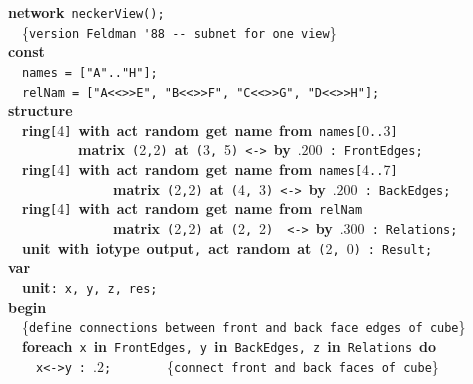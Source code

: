 {\bf network}~\verb&neckerView&\verb&(&\verb&)&\verb&;&\\
~~{\footnotesize \{\verb{version Feldman '88 -- subnet for one view{\}}\\
{\bf const}~\\
~~\verb&names&~\verb&=&~\verb&[&\verb&"A"&\verb&..&\verb&"H"&\verb&]&\verb&;&\\
~~\verb&relNam&~\verb&=&~\verb&[&\verb&"A<<>>E"&\verb&,&~\verb&"B<<>>F"&\verb&,&~\verb&"C<<>>G"&\verb&,&~\verb&"D<<>>H"&\verb&]&\verb&;&\\
{\bf structure}\\
~~{\bf ring}\verb&[&4\verb&]&~{\bf with}~{\bf act}~{\bf random}~{\bf get}~{\bf name}~{\bf from}~\verb&names&\verb&[&0\verb&..&3\verb&]&~\\
~~~~~~~~~~{\bf matrix}~\verb&(&2\verb&,&2\verb&)&~{\bf at}~\verb&(&3\verb&,&~5\verb&)&~\verb&<->&~{\bf by}~$.200$~\verb&:&~\verb&FrontEdges&\verb&;&\\
~~{\bf ring}\verb&[&4\verb&]&~{\bf with}~{\bf act}~{\bf random}~{\bf get}~{\bf name}~{\bf from}~\verb&names&\verb&[&4\verb&..&7\verb&]&\\
~~~~~~~~~~~~~~~{\bf matrix}~\verb&(&2\verb&,&2\verb&)&~{\bf at}~\verb&(&4\verb&,&~3\verb&)&~\verb&<->&~{\bf by}~$.200$~\verb&:&~\verb&BackEdges&\verb&;&\\
~~{\bf ring}\verb&[&4\verb&]&~{\bf with}~{\bf act}~{\bf random}~{\bf get}~{\bf name}~{\bf from}~\verb&relNam&~\\
~~~~~~~~~~~~~~~{\bf matrix}~\verb&(&2\verb&,&2\verb&)&~{\bf at}~\verb&(&2\verb&,&~2\verb&)&~~\verb&<->&~{\bf by}~$.300$~\verb&:&~\verb&Relations&\verb&;&\\
~~{\bf unit}~{\bf with}~{\bf iotype}~{\bf output}\verb&,&~{\bf act}~{\bf random}~{\bf at}~\verb&(&2\verb&,&~0\verb&)&~\verb&:&~\verb&Result&\verb&;&\\
{\bf var}\\
~~{\bf unit}\verb&:&~\verb&x&\verb&,&~\verb&y&\verb&,&~\verb&z&\verb&,&~\verb&res&\verb&;&\\
{\bf begin}\\
~~{\footnotesize \{\verb{define connections between front and back face edges of cube{\}}\\
~~{\bf foreach}~\verb&x&~{\bf in}~\verb&FrontEdges&\verb&,&~\verb&y&~{\bf in}~\verb&BackEdges&\verb&,&~\verb&z&~{\bf in}~\verb&Relations&~{\bf do}\\
~~~~\verb&x&\verb&<->&\verb&y&~\verb&:&~$.2$\verb&;&~~~~~~~~{\footnotesize \{\verb{connect front and back faces of cube{\}}\\
